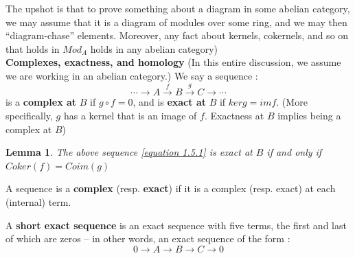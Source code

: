 \documentclass{article}
\newtheorem{lemma}[theorem]{Lemma}
\begin{document}
The upshot is that to prove something about a diagram in some abelian category, we may assume that it is a diagram of modules over some ring, and we may then “diagram-chase” elements. Moreover, any fact about kernels, cokernels, and so on that holds in $Mod_A$ holds in any abelian category)
\\

\textbf{Complexes, exactness, and homology}
(In this entire discussion, we assume we are working in an abelian category.)
We say a sequence :
\begin{equation}
    \cdots \rightarrow A \xrightarrow{f} B \xrightarrow{g} C  \rightarrow \cdots
    \label{equation 1.5.1}
\end{equation}
is a \textbf{complex at} $B$ if $g \circ f = 0$, and is \textbf{exact at} $B$ if $ker g = im f$. (More specifically,
$g$ has a kernel that is an image of $f$. Exactness at $B$ implies being a complex at $B$)
\begin{lemma}
    The above sequence \ref{equation 1.5.1} is exact at $B$ if and only if $Coker(f) = Coim(g)$
\end{lemma}
A sequence is a \textbf{complex} (resp. \textbf{exact}) if it is a complex (resp.
exact) at each (internal) term. 

A \textbf{short exact sequence} is an exact sequence with
five terms, the first and last of which are zeros -- in other words, an exact sequence
of the form :
$$
0
\rightarrow A \rightarrow B \rightarrow C  \rightarrow 0
$$
\end{document}
